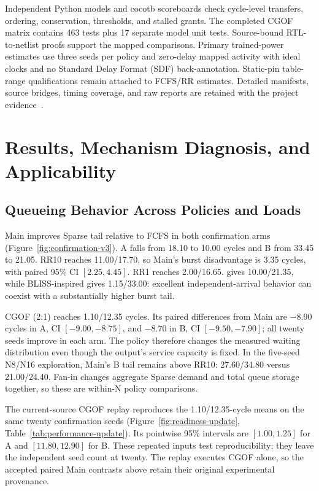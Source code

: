 Independent Python models and cocotb scoreboards check cycle-level transfers, ordering, conservation, thresholds, and stalled grants. The completed CGOF matrix contains 463 tests plus 17 separate model unit tests. Source-bound RTL-to-netlist proofs support the mapped comparisons. Primary trained-power estimates use three seeds per policy and zero-delay mapped activity with ideal clocks and no Standard Delay Format (SDF) back-annotation. Static-pin table-range qualifications remain attached to FCFS/RR estimates. Detailed manifests, source bridges, timing coverage, and raw reports are retained with the project evidence~\cite{artifact}.

\section{Results, Mechanism Diagnosis, and Applicability}
\label{sec:results}
\subsection{Queueing Behavior Across Policies and Loads}
Main improves Sparse tail relative to FCFS in both confirmation arms (Figure~\ref{fig:confirmation-v3}). A falls from 18.10 to 10.00 cycles and B from 33.45 to 21.05. RR10 reaches 11.00/17.70, so Main's burst disadvantage is 3.35 cycles, with paired 95\% CI $[2.25,4.45]$. RR1 reaches 2.00/16.65. \Alg{} gives 10.00/21.35, while BLISS-inspired gives 1.15/33.00: excellent independent-arrival behavior can coexist with a substantially higher burst tail.

CGOF (2:1) reaches 1.10/12.35 cycles. Its paired differences from Main are $-8.90$ cycles in A, CI $[-9.00,-8.75]$, and $-8.70$ in B, CI $[-9.50,-7.90]$; all twenty seeds improve in each arm. The policy therefore changes the measured waiting distribution even though the output's service capacity is fixed. In the five-seed N8/N16 exploration, Main's B tail remains above RR10: 27.60/34.80 versus 21.00/24.40. Fan-in changes aggregate Sparse demand and total queue storage together, so these are within-N policy comparisons.

The current-source CGOF replay reproduces the 1.10/12.35-cycle means on the same twenty confirmation seeds (Figure~\ref{fig:readiness-update}, Table~\ref{tab:performance-update}). Its pointwise 95\% intervals are $[1.00,1.25]$ for A and $[11.80,12.90]$ for B. These repeated inputs test reproducibility; they leave the independent seed count at twenty. The replay executes CGOF alone, so the accepted paired Main contrasts above retain their original experimental provenance.

